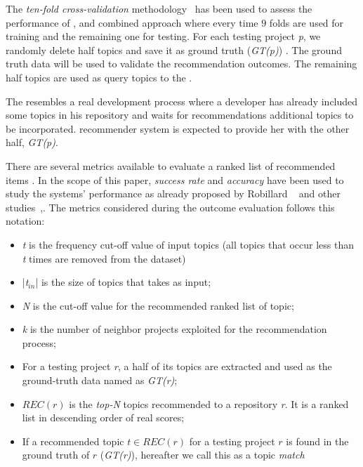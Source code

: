 The \emph{ten-fold cross-validation} methodology~\cite{kohavi1995study} has been used to assess the performance of \CT, \MNB and combined approach where every time $9$ folds 
are used for training and the remaining one for testing.
For each testing project \emph{p}, we randomly delete half topics and save it as ground truth (\emph{GT(p)}) . The ground truth data  will be used to validate the recommendation outcomes. The remaining half topics are used as query topics to the \CT.%

The  resembles a real development process where a developer has already included some topics in his repository and waits for recommendations \ie additional topics to be incorporated. \CT recommender system is expected to provide her with the other half, \ie \emph{GT(p)}. 

There are several metrics available to evaluate a ranked list of recommended items \cite{DBLP:conf/rweb/NoiaO15}. In the scope of this paper, \emph{success rate} and \emph{accuracy} have been used to study the systems' performance as already proposed by Robillard \etal~\cite{Robillard:2014:RSS:2631387} and other studies~\cite{6671293},\cite{Nguyen:2015:ESP:2740908.2742141}. The metrics considered during the outcome evaluation follows this notation:

\begin{itemize}[noitemsep,topsep=0pt]
	\item \emph{t} is the frequency cut-off value of input topics (\ie all topics that occur less than \emph{t} times are removed from the dataset)
	\item |\emph{t$_{in}$}| is the size of topics that \CT takes as input;
	\item \emph{N} is the cut-off value for the recommended ranked list of topic;%
	\item \emph{k} is the number of neighbor projects exploited for the recommendation process;
	\item For a testing project \emph{r}, a half of its topics are extracted and used as the ground-truth data named as \emph{GT(r)};
	\item $REC(r)$ is the \emph{top-N} topics recommended to a repository \emph{r}. It is a ranked list in descending order of real scores;
	\item If a recommended topic $t \in REC(r)$ for a testing project $r$ is found in the ground truth of $r$ (\ie \emph{GT(r)}), hereafter we call this as a topic \textit{match}
\end{itemize}



